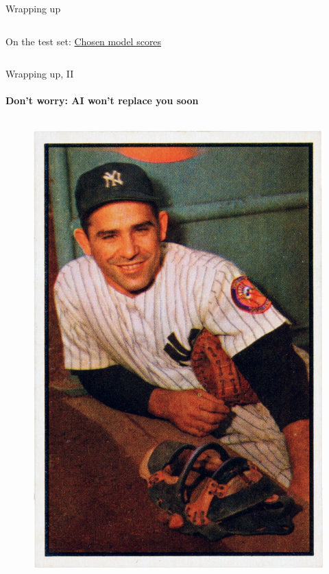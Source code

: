 \begin{frame}{Wrapping up}
\begin{columns}[T]
\begin{column}{0.48\textwidth}
            On the test set: \href{https://github.com/munichpavel/risk-ai-workshop/blob/main/notebooks/data/evaluate_fit_test}{Chosen model scores}
        \end{column}
    \end{columns}
\end{frame}

\begin{frame}{Wrapping up, II}
    \framesubtitle{Don't worry: AI won't replace you soon}
    \begin{columns}[T] %
        \begin{column}{.40\textwidth}
            \begin{figure}[ht]
                \includegraphics[height=0.4\textheight]{graphics/1953_Bowman_Yogi_Berra}
            \end{figure}

\end{column}
\end{columns}
\end{frame}
